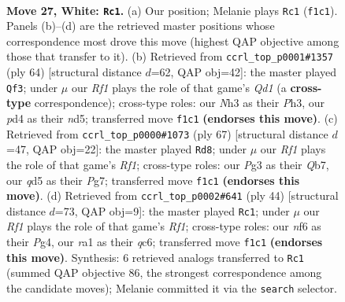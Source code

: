 \documentclass[11pt]{article}
\begin{document}
\clearpage

\begin{figure}[p]\centering
\begin{subfigure}{0.46\textwidth}\centering
\resizebox{\linewidth}{!}{%
\newchessgame
\chessboard[
  setfen={1Q6/5pk1/5np1/3q3p/3p3P/3P2PN/5P2/rN3RK1 w - - 1 27},
  showmover=false,
  pgfstyle=straightmove, color=movearrow, markmove={f1-c1}
]}
\caption{}
\end{subfigure}\hfill
\begin{subfigure}{0.46\textwidth}\centering
\resizebox{\linewidth}{!}{%
\newchessgame
\chessboard[
  setfen={4R3/p1q2ppk/1p5p/3n4/3r4/P2N2PP/1P3P2/3Q2K1 w - - 1 33},
  showmover=false,
  pgfstyle=straightmove, color=movearrow, markmove={d1-f3}
]}
\caption{}
\end{subfigure}
\\[4pt]
\begin{subfigure}{0.46\textwidth}\centering
\resizebox{\linewidth}{!}{%
\newchessgame
\chessboard[
  setfen={5rk1/1q3pp1/p3p2p/2RnP2P/8/5NP1/P1Q2PK1/8 b - - 5 34},
  showmover=false,
  pgfstyle=straightmove, color=movearrow, markmove={f8-d8}
]}
\caption{}
\end{subfigure}\hfill
\begin{subfigure}{0.46\textwidth}\centering
\resizebox{\linewidth}{!}{%
\newchessgame
\chessboard[
  setfen={1r4k1/3n1ppp/2q1p3/1p6/3P2P1/4PN2/1Q3PP1/5RK1 w - - 0 23},
  showmover=false,
  pgfstyle=straightmove, color=movearrow, markmove={f1-c1}
]}
\caption{}
\end{subfigure}
\caption{\textbf{Move 27, White: \texttt{Rc1}.} (a) Our position; Melanie plays \texttt{Rc1} (\texttt{f1c1}). Panels (b)--(d) are the retrieved master positions whose correspondence most drove this move (highest QAP objective among those that transfer to it). (b) Retrieved from \texttt{ccrl\_top\_p0001\#1357} (ply 64) [structural distance $d$=62, QAP obj=42]: the master played \texttt{Qf3}; under $\mu$ our \emph{Rf1} plays the role of that game's \emph{Qd1} (a \textbf{cross-type} correspondence); cross-type roles: our \emph{N}h3 as their \emph{P}h3, our \emph{p}d4 as their \emph{n}d5; transferred move \texttt{f1c1} \textbf{(endorses this move)}. (c) Retrieved from \texttt{ccrl\_top\_p0000\#1073} (ply 67) [structural distance $d$=47, QAP obj=22]: the master played \texttt{Rd8}; under $\mu$ our \emph{Rf1} plays the role of that game's \emph{Rf1}; cross-type roles: our \emph{P}g3 as their \emph{Q}b7, our \emph{q}d5 as their \emph{P}g7; transferred move \texttt{f1c1} \textbf{(endorses this move)}. (d) Retrieved from \texttt{ccrl\_top\_p0002\#641} (ply 44) [structural distance $d$=73, QAP obj=9]: the master played \texttt{Rc1}; under $\mu$ our \emph{Rf1} plays the role of that game's \emph{Rf1}; cross-type roles: our \emph{n}f6 as their \emph{P}g4, our \emph{r}a1 as their \emph{q}c6; transferred move \texttt{f1c1} \textbf{(endorses this move)}. Synthesis: 6 retrieved analogs transferred to \texttt{Rc1} (summed QAP objective 86, the strongest correspondence among the candidate moves); Melanie committed it via the \texttt{search} selector.}
\label{fig:thought-m52}
\end{figure}
\end{document}
